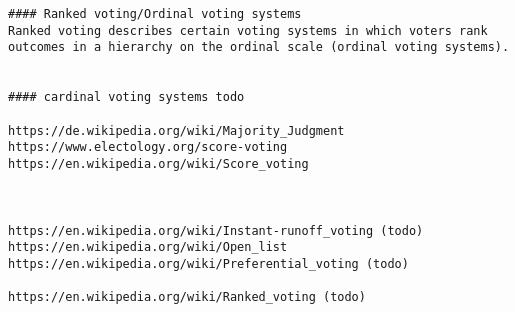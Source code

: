 {{\begin{verbatim}
#### Ranked voting/Ordinal voting systems 
Ranked voting describes certain voting systems in which voters rank outcomes in a hierarchy on the ordinal scale (ordinal voting systems). 


#### cardinal voting systems todo 

https://de.wikipedia.org/wiki/Majority_Judgment
https://www.electology.org/score-voting
https://en.wikipedia.org/wiki/Score_voting 



https://en.wikipedia.org/wiki/Instant-runoff_voting (todo)
https://en.wikipedia.org/wiki/Open_list
https://en.wikipedia.org/wiki/Preferential_voting (todo)

https://en.wikipedia.org/wiki/Ranked_voting (todo)

\end{verbatim}
}}%

